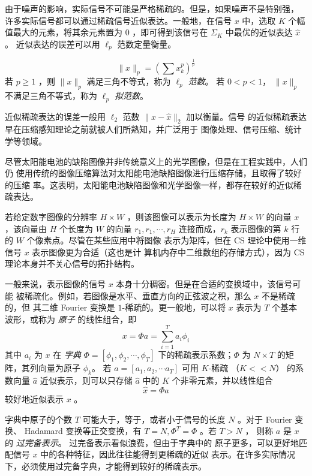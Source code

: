 由于噪声的影响，实际信号不可能是严格稀疏的。但是，如果噪声不是特别强，
许多实际信号都可以通过稀疏信号近似表达。一般地，在信号 $x$ 中，选取
$K$ 个幅值最大的元素，将其余元素置为 $0$ ，即可得到该信号在 $\Sigma_K$
中最优的近似表达 $\hat x$。\cite{KeepK} 近似表达的误差可以用 $\ell_p$
范数定量衡量。
\begin{definition} \label{def:lp}
$$\|x\|_p = \left( \sum x_k^p \right)^{\frac{1}{p}}$$
若 $p \geq 1$ ，则 $\|x\|_p$ 满足三角不等式，称为 \emph{$\ell_p$ 范数}。
若 $0 < p < 1$， $\|x\|_p$ 不满足三角不等式，称为 \emph{$\ell_p$ 拟范数}。
\end{definition}

近似稀疏表达的误差一般用 $\ell_2$ 范数 $\|x - \hat x\|_2$ 加以衡量。信号
的近似稀疏表达早在压缩感知理论之前就被人们所熟知，并广泛用于
图像处理\cite{MathProblemImage}、信号压缩、统计学\cite{lasso}等领域。

尽管太阳能电池的缺陷图像并非传统意义上的光学图像，但是在工程实践中，人们仍
使用传统的图像压缩算法对太阳能电池缺陷图像进行压缩存储，且取得了较好的压缩
率。这表明，太阳能电池缺陷图像和光学图像一样，都存在较好的近似稀疏表达。

若给定数字图像的分辨率 $H \times W$ ，则该图像可以表示为长度为 $H \times W$
的向量 $x$ ，该向量由 $H$ 个长度为 $W$ 的向量 $r_1, r_1, \cdots, r_H$
连接而成，$r_k$ 表示图像的第 $k$ 行的 $W$ 个像素点。尽管在某些应用中将图像
表示为矩阵，但在 CS 理论中使用一维信号 $x$ 表示图像更为合适（这也是计
算机内存中二维数组的存储方式），因为 CS 理论本身并不关心信号的拓扑结构。

一般来说，表示图像的信号 $x$ 本身十分稠密。但是在合适的变换域中，该信号可能
被稀疏化。例如，若图像是水平、垂直方向的正弦波之积，那么 $x$ 不是稀疏的，但
其二维 Fourier 变换是 $1$-稀疏的。更一般地，可以将 $x$ 表示为 $T$ 个基本
波形，或称为 \emph{原子} 的线性组合，即
\begin{equation}
x = \Phi a = \sum_{i=1}^T a_i \phi_i
\end{equation}
其中 $a_i$ 为 $x$ 在 \emph{字典} $\Phi = [\phi_1, \phi_2, \cdots, \phi_T]$
下的稀疏表示系数；$\Phi$ 为 $N \times T$ 的矩阵，其列向量为原子 $\phi_k$。
若 $a = [a_1, a_2, \cdots a_T]$ 可用 $K$-稀疏 （$K << N$） 的系数向量
$\hat a$ 近似表示，则可以只存储 $\hat a$ 中的 $K$ 个非零元素，并以线性组合
\begin{equation}
\hat x = \Phi \hat a
\end{equation}
较好地近似表示 $x$ 。

字典中原子的个数 $T$ 可能大于，等于，或者小于信号的长度 $N$ 。对于 Fourier
变换、 Hadamard 变换等正交变换，有 $T = N, \Phi^T = \Phi$ 。若 $T > N$ ，
则称 $a$ 是 $x$ 的 \emph{过完备表示}。 过完备表示看似浪费，但由于字典中的
原子更多，可以更好地匹配信号 $x$ 中的各种特征，因此往往能得到更稀疏的近似
表示。在许多实际情况下，必须使用过完备字典，才能得到较好的稀疏表示。

